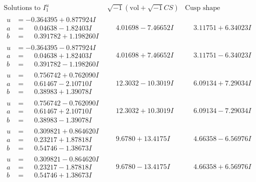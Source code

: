 \documentclass[1p]{elsarticle_modified}
\theoremstyle{definition}
\newcommand{\I}{\sqrt{-1}}
\begin{document}
$$\begin{array}{c|c|c}  
\text{Solutions to }I^u_{1}& \I (\text{vol} + \sqrt{-1}CS) & \text{Cusp shape}\\
 \hline 
\begin{aligned}
u &= -0.364395 + 0.877924 I \\
a &= \phantom{-}0.04638 - 1.82403 I \\
b &= \phantom{-}0.391782 + 1.198260 I\end{aligned}
 & \phantom{-}4.01698 - 7.46652 I & \phantom{-}3.11751 + 6.34023 I \\ \hline\begin{aligned}
u &= -0.364395 - 0.877924 I \\
a &= \phantom{-}0.04638 + 1.82403 I \\
b &= \phantom{-}0.391782 - 1.198260 I\end{aligned}
 & \phantom{-}4.01698 + 7.46652 I & \phantom{-}3.11751 - 6.34023 I \\ \hline\begin{aligned}
u &= \phantom{-}0.756742 + 0.762090 I \\
a &= \phantom{-}0.61467 - 2.10710 I \\
b &= \phantom{-}0.38983 + 1.39078 I\end{aligned}
 & \phantom{-}12.3032 - 10.3019 I & \phantom{-}6.09134 + 7.29034 I \\ \hline\begin{aligned}
u &= \phantom{-}0.756742 - 0.762090 I \\
a &= \phantom{-}0.61467 + 2.10710 I \\
b &= \phantom{-}0.38983 - 1.39078 I\end{aligned}
 & \phantom{-}12.3032 + 10.3019 I & \phantom{-}6.09134 - 7.29034 I \\ \hline\begin{aligned}
u &= \phantom{-}0.309821 + 0.864620 I \\
a &= \phantom{-}0.23217 + 1.87818 I \\
b &= \phantom{-}0.54746 - 1.38673 I\end{aligned}
 & \phantom{-}9.6780 + 13.4175 I & \phantom{-}4.66358 - 6.56976 I \\ \hline\begin{aligned}
u &= \phantom{-}0.309821 - 0.864620 I \\
a &= \phantom{-}0.23217 - 1.87818 I \\
b &= \phantom{-}0.54746 + 1.38673 I\end{aligned}
 & \phantom{-}9.6780 - 13.4175 I & \phantom{-}4.66358 + 6.56976 I \\ \hline\begin{aligned}

\end{aligned}
\end{array}$$
\end{document}
